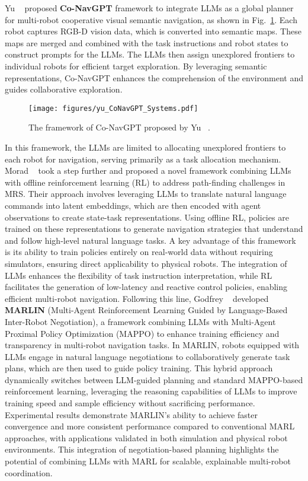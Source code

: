 Yu \etal~\cite{yu_co-navgpt_2023} proposed \textbf{Co-NavGPT} framework to integrate LLMs as a global planner for multi-robot cooperative visual semantic navigation, as shown in Fig.~\ref{fig:Co-NavGPT}. Each robot captures RGB-D vision data, which is converted into semantic maps. These maps are merged and combined with the task instructions and robot states to construct prompts for the LLMs. The LLMs then assign unexplored frontiers to individual robots for efficient target exploration. By leveraging semantic representations, Co-NavGPT enhances the comprehension of the environment and guides collaborative exploration. 
\begin{figure}[ht]
    \centering
    \texttt{[image: figures/yu\_CoNavGPT\_Systems.pdf]}
    \caption{The framework of Co-NavGPT proposed by Yu \etal~\cite{yu_co-navgpt_2023}.}
    \label{fig:Co-NavGPT}
\end{figure}
In this framework, the LLMs are limited to allocating unexplored frontiers to each robot for navigation, serving primarily as a task allocation mechanism. 
Morad \etal~\cite{morad_language-conditioned_2024} took a step further and proposed a novel framework combining LLMs with offline reinforcement learning (RL) to address path-finding challenges in MRS. Their approach involves leveraging LLMs to translate natural language commands into latent embeddings, which are then encoded with agent observations to create state-task representations. Using offline RL, policies are trained on these representations to generate navigation strategies that understand and follow high-level natural language tasks. A key advantage of this framework is its ability to train policies entirely on real-world data without requiring simulators, ensuring direct applicability to physical robots. The integration of LLMs enhances the flexibility of task instruction interpretation, while RL facilitates the generation of low-latency and reactive control policies, enabling efficient multi-robot navigation.
Following this line, Godfrey \etal~\cite{godfrey_marlin_2024} developed \textbf{MARLIN} (Multi-Agent Reinforcement Learning Guided by Language-Based Inter-Robot Negotiation), a framework combining LLMs with Multi-Agent Proximal Policy Optimization (MAPPO) to enhance training efficiency and transparency in multi-robot navigation tasks. In MARLIN, robots equipped with LLMs engage in natural language negotiations to collaboratively generate task plans, which are then used to guide policy training. This hybrid approach dynamically switches between LLM-guided planning and standard MAPPO-based reinforcement learning, leveraging the reasoning capabilities of LLMs to improve training speed and sample efficiency without sacrificing performance. Experimental results demonstrate MARLIN's ability to achieve faster convergence and more consistent performance compared to conventional MARL approaches, with applications validated in both simulation and physical robot environments. This integration of negotiation-based planning highlights the potential of combining LLMs with MARL for scalable, explainable multi-robot coordination.

